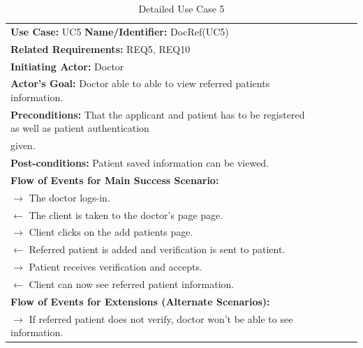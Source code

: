 \documentclass[a4paper]{article}
\begin{document}
\FloatBarrier

\begin{table}[h!]
\centering
\caption*{Detailed Use Case 5}
\label{DetailedUC2}
\begin{tabular}{|c|llll}
\cline{1-1}

\multicolumn{1}{|l|}{\textbf{Use Case:} UC5 \textbf{Name/Identifier:} DocRef(UC5)} &  &  &  &  \\ \cline{1-1}

\multicolumn{1}{|l|}{\textbf{Related Requirements:} REQ5, REQ10} &  &  &  &  \\

\multicolumn{1}{|l|}{\textbf{Initiating Actor:} Doctor} &  &  &  &  \\

\multicolumn{1}{|l|}{\textbf{Actor’s Goal:} Doctor able to able to view referred patients information.} &  &  &  &  \\

\multicolumn{1}{|l|}{\textbf{Preconditions:} That the applicant and patient has to be registered as well as patient authentication} &  &  &  &  \\

\multicolumn{1}{|l|}{given.} &  &  &  &  \\

\multicolumn{1}{|l|}{\textbf{Post-conditions:} Patient saved information can be viewed.} &  &  &  &  \\

\multicolumn{1}{|l|}{\textbf{Flow of Events for Main Success Scenario:}} &  &  &  &  \\

\multicolumn{1}{|l|}{ $ \rightarrow $ The doctor logs-in.} &  &  &  &  \\

\multicolumn{1}{|l|}{ $ \leftarrow $ The client is taken to the doctor's page page.} &  &  &  &  \\

\multicolumn{1}{|l|}{ $ \rightarrow $ Client clicks on the add patients page.} &  &  &  &  \\

\multicolumn{1}{|l|}{ $ \leftarrow $ Referred patient is added and verification is sent to patient.} &  &  &  &  \\

\multicolumn{1}{|l|}{ $ \rightarrow $ Patient receives verification and accepts.} &  &  &  &  \\

\multicolumn{1}{|l|}{ $ \leftarrow $ Client can now see referred patient information.} &  &  &  &  \\

\multicolumn{1}{|l|}{\textbf{Flow of Events for Extensions (Alternate Scenarios):}} &  &  &  &  \\

\multicolumn{1}{|l|}{ $ \rightarrow $ If referred patient does not verify, doctor won't be able to see information.} &  &  &  &  \\ \cline{1-1}

\end{tabular}
\end{table}
\end{document}
